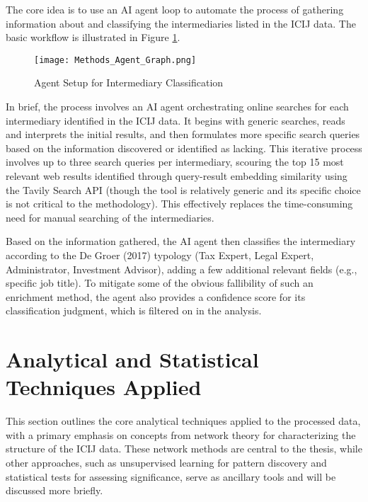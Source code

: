 The core idea is to use an AI agent loop to automate the process of gathering information about and classifying the intermediaries listed in the ICIJ data. The basic workflow is illustrated in Figure \ref{fig:agent_loop_placeholder}.

\begin{figure}[htbp]
    \centering
    \texttt{[image: Methods\_Agent\_Graph.png]}
    \caption{Agent Setup for Intermediary Classification}
    \label{fig:agent_loop_placeholder}
\end{figure}

In brief, the process involves an AI agent orchestrating online searches for each intermediary identified in the ICIJ data. It begins with generic searches, reads and interprets the initial results, and then formulates more specific search queries based on the information discovered or identified as lacking. This iterative process involves up to three search queries per intermediary, scouring the top 15 most relevant web results identified through query-result embedding similarity using the Tavily Search API (though the tool is relatively generic and its specific choice is not critical to the methodology). This effectively replaces the time-consuming need for manual searching of the intermediaries.

Based on the information gathered, the AI agent then classifies the intermediary according to the De Groer (2017) typology (Tax Expert, Legal Expert, Administrator, Investment Advisor), adding a few additional relevant fields (e.g., specific job title). To mitigate some of the obvious fallibility of such an enrichment method, the agent also provides a confidence score for its classification judgment, which is filtered on in the analysis.


\section{Analytical and Statistical Techniques Applied}
\label{sec:3_3_analytical_methodologies}

This section outlines the core analytical techniques applied to the processed data, with a primary emphasis on concepts from network theory for characterizing the structure of the ICIJ data. These network methods are central to the thesis, while other approaches, such as unsupervised learning for pattern discovery and statistical tests for assessing significance, serve as ancillary tools and will be discussed more briefly.

